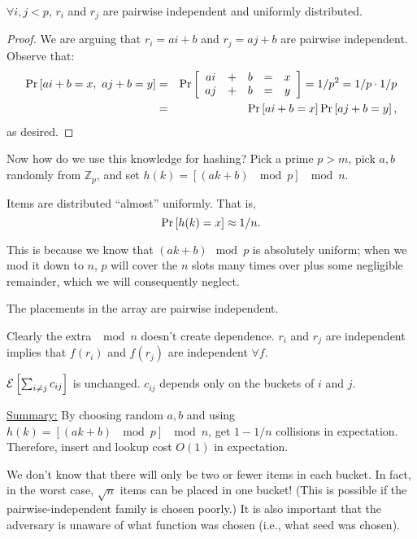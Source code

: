 \documentclass{article}
\renewcommand{\Pr}[1]{\textnormal{Pr}\left[ #1 \right]}
\begin{document}
\begin{claim}
$\forall i,j < p$, $r_i$ and $r_j$ are pairwise independent and uniformly distributed.
\end{claim}

\begin{proof}
We are arguing that $r_i = ai + b$ and $r_j = aj + b$ are pairwise independent.  Observe that:
\begin{eqnarray*}
  \Pr{ai+b = x,\ aj+b = y} & = &
  \Pr{
  \begin{array}{ccccc}
    a i & + & b & = & x \\
    a j & + & b & = & y 
  \end{array}
  }
  = 1/p^2 = 1/p \cdot 1/p \\
  & = & \Pr{ai+b = x}\Pr{aj+b = y},
\end{eqnarray*}
as desired. \hfill
\end{proof}

Now how do we use this knowledge for hashing?  Pick a prime $p > m$, pick $a,b$ randomly from ${\mathbb Z}_p$, and set $h(k) = [(ak+b)\ \mod p]\ \mod n$.

\begin{claim}
  Items are distributed ``almost'' uniformly.  That is,
$$\Pr{h(k) = x} \approx 1/n.$$
\end{claim}

This is because we know that $(ak+b)\mod p$ is absolutely uniform; when we mod it down to $n$, $p$ will cover the $n$ slots many times over plus some negligible remainder, which we will consequently neglect.

\begin{claim}
  The placements in the array are pairwise independent.
\end{claim}

Clearly the extra $\mod n$ doesn't create dependence.  $r_i$ and $r_j$ are independent implies that $f(r_i)$ and $f(r_j)$ are independent $\forall f$.

\begin{claim}
  ${\cal E}\left[\sum_{i\not=j} c_{ij}\right]$ is unchanged.  $c_{ij}$ depends only on the buckets of $i$ and $j$.
\end{claim}

\underline{Summary:} By choosing random $a,b$ and using $h(k) = [(ak+b)\ \mod p]\ \mod n$, get $1-1/n$ collisions in expectation.  Therefore, insert and lookup cost $O(1)$ in expectation.

We don't know that there will only be two or fewer items in each bucket.  In fact, in the worst case, $\sqrt{n}$ items can be placed in one bucket!  (This is possible if the pairwise-independent family is chosen poorly.)  It is also important that the adversary is unaware of what function was chosen (i.e., what seed was chosen).
\end{document}
